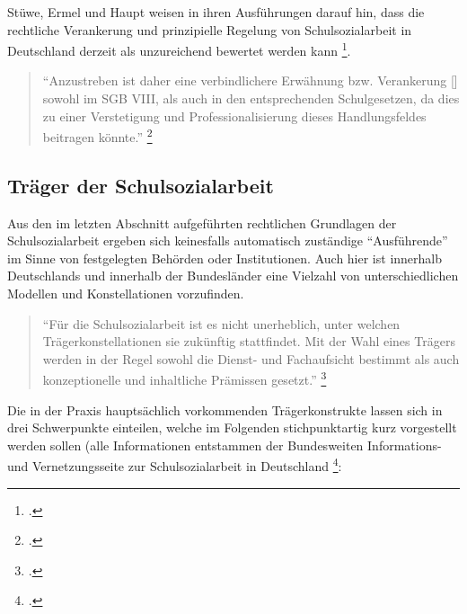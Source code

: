 Stüwe, Ermel und Haupt weisen in ihren Ausführungen darauf hin, dass die rechtliche Verankerung und prinzipielle Regelung von Schulsozialarbeit in Deutschland derzeit als unzureichend bewertet werden kann \footcite[30]{Stuewe2015}. 

\begin{quotation}
\noindent
"`Anzustreben ist daher eine verbindlichere Erwähnung bzw. Verankerung [\punkte] sowohl im SGB VIII, als auch in den entsprechenden Schulgesetzen, da dies zu einer Verstetigung und Professionalisierung dieses Handlungsfeldes beitragen könnte."' \footcite[30]{Stuewe2015}
\end{quotation}

\subsection{Träger der Schulsozialarbeit}
\label{sec:TrägerDerSchulsozialarbeit}

Aus den im letzten Abschnitt aufgeführten rechtlichen Grundlagen der Schulsozialarbeit ergeben sich keinesfalls automatisch zuständige "`Ausführende"' im Sinne von festgelegten Behörden oder Institutionen. Auch hier ist innerhalb Deutschlands und innerhalb der Bundesländer eine Vielzahl von unterschiedlichen Modellen und Konstellationen vorzufinden. 

\begin{quotation}
\noindent
"`Für die Schulsozialarbeit ist es nicht unerheblich, unter welchen Trägerkonstellationen sie zukünftig stattfindet. Mit der Wahl eines Trägers werden in der Regel sowohl die Dienst- und Fachaufsicht bestimmt als auch konzeptionelle und inhaltliche Prämissen gesetzt."' \footcite{BIVSD2013}
\end{quotation}

Die in der Praxis hauptsächlich vorkommenden Trägerkonstrukte lassen sich in drei Schwerpunkte einteilen, welche im Folgenden stichpunktartig kurz vorgestellt werden sollen (alle Informationen entstammen der Bundesweiten Informations- und Vernetzungsseite zur Schulsozialarbeit in Deutschland \footcite{BIVSD2013}:\\


